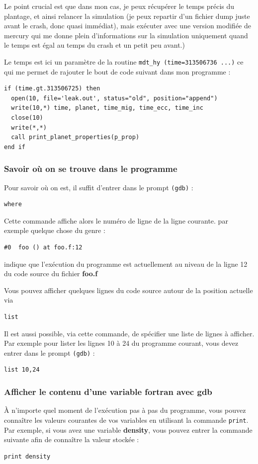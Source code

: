 \documentclass[a4paper,twoside]{article}
\begin{document}
\begin{important}
Le point crucial est que dans mon cas, je peux récupérer le temps précis du plantage, et ainsi relancer la simulation (je peux repartir d'un fichier dump juste avant le crash, donc quasi immédiat), mais exécuter avec une version modifiée de mercury qui me donne plein d'informations sur la simulation uniquement quand le temps est égal au temps du crash et un petit peu avant.)

Le temps est ici un paramètre de la routine \verb|mdt_hy (time=313506736 ...)| ce qui me permet de rajouter le bout de code suivant dans mon programme : 
\begin{verbatim}
if (time.gt.313506725) then
  open(10, file='leak.out', status="old", position="append")
  write(10,*) time, planet, time_mig, time_ecc, time_inc
  close(10)
  write(*,*)
  call print_planet_properties(p_prop)
end if
\end{verbatim}
\end{important}

\subsubsection{Savoir où on se trouve dans le programme}
Pour savoir où on est, il suffit d'entrer dans le prompt \texttt{(gdb)} :
\begin{verbatim}
where
\end{verbatim}
Cette commande affiche alors le numéro de ligne de la ligne courante. par exemple quelque chose du genre : 
\begin{verbatim}
#0  foo () at foo.f:12
\end{verbatim}
indique que l'exécution du programme est actuellement au niveau de la ligne 12 du code source du fichier \textbf{foo.f}

\bigskip

Vous pouvez afficher quelques lignes du code source autour de la position actuelle via 
\begin{verbatim}
list
\end{verbatim}

Il est aussi possible, via cette commande, de spécifier une liste de lignes à afficher. Par exemple pour lister les lignes 10 à 24 du programme courant, vous devez entrer dans le prompt \texttt{(gdb)} :
\begin{verbatim}
list 10,24
\end{verbatim}

\subsubsection{Afficher le contenu d'une variable fortran avec gdb}
À n'importe quel moment de l'exécution pas à pas du programme, vous pouvez connaître les valeurs courantes de vos variables en utilisant la commande \texttt{print}. Par exemple, si vous avez une variable \textbf{density}, vous pouvez entrer la commande suivante afin de connaître la valeur stockée : 
\begin{verbatim}
print density
\end{verbatim}
 
\end{document}

